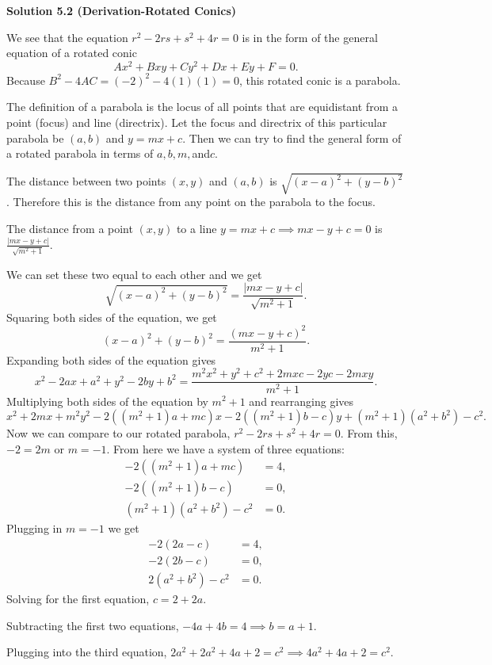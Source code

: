 \begin{enumerate}
 



\textbf{Solution 5.2 (Derivation-Rotated Conics)}

We see that the equation $r^2-2rs+s^2+4r = 0$ is in the form of the general equation of a rotated conic 
 \[Ax^2+Bxy+Cy^2+Dx+Ey+F = 0.\] Because $B^2 -4AC = (-2)^2 - 4(1)(1) = 0$, this rotated conic is a parabola. 

 The definition of a parabola is the locus of all points that are equidistant from a point (focus) and line (directrix). Let the focus and directrix of this particular parabola be $(a,b)$ and $y = mx+c$. Then we can try to find the general form of a rotated parabola in terms of $a, b, m,$and$c$. 

 The distance between two points $(x,y)$ and $(a,b)$ is $\sqrt{(x-a)^2+(y-b)^2}$. Therefore this is the distance from any point on the parabola to the focus. 

 The distance from a point $(x,y)$ to a line $y = mx+c \implies mx-y+c = 0$ is $\frac{|mx-y+c|}{\sqrt{m^2+1}}$.

 We can set these two equal to each other and we get 
 \[\sqrt{(x-a)^2+(y-b)^2} = \frac{|mx-y+c|}{\sqrt{m^2+1}}.\]Squaring both sides of the equation, we get 
 \[(x-a)^2+(y-b)^2 = \frac{(mx-y+c)^2}{m^2+1}.\]Expanding both sides of the equation gives 
 \[x^2-2ax+a^2+y^2-2by+b^2 = \frac{m^2x^2+y^2+c^2+2mxc-2yc-2mxy}{m^2+1}.\]Multiplying both sides of the equation by $m^2+1$ and rearranging gives 
 \[x^2+2mx+m^2y^2-2((m^2+1)a + mc)x-2((m^2+1)b - c)y +(m^2+1)(a^2+b^2)-c^2.\]Now we can compare to our rotated parabola, $r^2-2rs+s^2+4r = 0$. From this, $-2 = 2m$ or $m = -1$. From here we have a system of three equations:
 \begin{align*} -2((m^2+1)a + mc) &= 4, \\ -2((m^2+1)b - c) &= 0, \\ (m^2+1)(a^2+b^2)-c^2 &= 0. \end{align*}
Plugging in $m=-1$ we get
 \begin{align*} -2(2a-c) &= 4, \\ -2(2b-c) &= 0, \\ 2(a^2+b^2) - c^2 &= 0. \end{align*}
Solving for the first equation, $c = 2+2a$.

 Subtracting the first two equations, $-4a+4b = 4 \implies b = a+1$.

 Plugging into the third equation, $2a^2+2a^2+4a+2 = c^2 \implies 4a^2+4a+2 = c^2$.


\end{enumerate}
